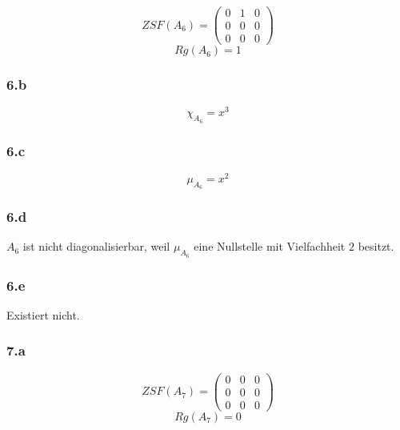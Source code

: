 \documentclass[10pt,a4paper]{article}
\begin{document}
\begin{equation}
ZSF(A_{6}) = 
\begin{pmatrix}
0 & 1 & 0\\
0 & 0 & 0\\
0 & 0 & 0
\end{pmatrix}
\end{equation}
\begin{equation}
Rg(A_{6}) = 1
\end{equation}

\subsubsection*{6.b}

\begin{equation}
\chi_{A_{6}} = x^{3}
\end{equation}

\subsubsection*{6.c}

\begin{equation}
\mu_{A_{6}} = x^{2}
\end{equation}

\subsubsection*{6.d}

$A_{6}$ ist nicht diagonalisierbar, weil $\mu_{A_{6}}$ eine Nullstelle mit Vielfachheit $2$ besitzt.

\subsubsection*{6.e}

Existiert nicht.

\subsubsection*{7.a}

\begin{equation}
ZSF(A_{7}) = 
\begin{pmatrix}
0 & 0 & 0\\
0 & 0 & 0\\
0 & 0 & 0
\end{pmatrix}
\end{equation}
\begin{equation}
Rg(A_{7}) = 0
\end{equation}
\end{document}
